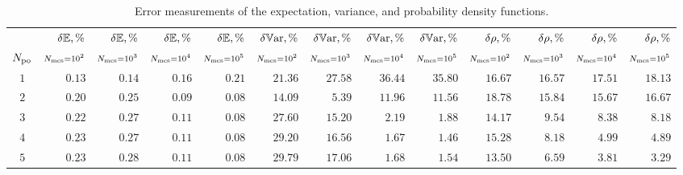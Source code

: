 \begin{table*}
  \centering
  \caption{Error measurements of the expectation, variance, and probability density functions.}
  \begin{tabular}{c@{\csep}r@{\csep}r@{\csep}r@{\csep}r@{\psep}r@{\csep}r@{\csep}r@{\csep}r@{\psep}r@{\csep}r@{\csep}r@{\csep}r}
    \toprule
    {} & $\delta\mathbb{E}, \%$ & $\delta\mathbb{E}, \%$ & $\delta\mathbb{E}, \%$ & $\delta\mathbb{E}, \%$ & $\delta\mathbb{V}\text{ar}, \%$ & $\delta\mathbb{V}\text{ar}, \%$ & $\delta\mathbb{V}\text{ar}, \%$ & $\delta\mathbb{V}\text{ar}, \%$ & $\delta\rho, \%$ & $\delta\rho, \%$ & $\delta\rho, \%$ & $\delta\rho, \%$ \\
    ${N_\text{po}}$ & $\scriptstyle N_\text{mcs} = 10^2$ & $\scriptstyle N_\text{mcs} = 10^3$ & $\scriptstyle N_\text{mcs} = 10^4$ & $\scriptstyle N_\text{mcs} = 10^5$ & $\scriptstyle N_\text{mcs} = 10^2$ & $\scriptstyle N_\text{mcs} = 10^3$ & $\scriptstyle N_\text{mcs} = 10^4$ & $\scriptstyle N_\text{mcs} = 10^5$ & $\scriptstyle N_\text{mcs} = 10^2$ & $\scriptstyle N_\text{mcs} = 10^3$ & $\scriptstyle N_\text{mcs} = 10^4$ & $\scriptstyle N_\text{mcs} = 10^5$ \\
    \cmidrule(r{15pt}){2-5}
    \cmidrule(r{15pt}){6-9}
    \cmidrule{10-13}
    $1$ & $0.13$ & $0.14$ & $0.16$ & $0.21$ & $21.36$ & $27.58$ & $36.44$ & $35.80$ & $16.67$ & $16.57$ & $17.51$ & $18.13$ \\
    $2$ & $0.20$ & $0.25$ & $0.09$ & $0.08$ & $14.09$ & $ 5.39$ & $11.96$ & $11.56$ & $18.78$ & $15.84$ & $15.67$ & $16.67$ \\
    $3$ & $0.22$ & $0.27$ & $0.11$ & $0.08$ & $27.60$ & $15.20$ & $ 2.19$ & $ 1.88$ & $14.17$ & $ 9.54$ & $ 8.38$ & $ 8.18$ \\
    $4$ & $0.23$ & $0.27$ & $0.11$ & $0.08$ & $29.20$ & $16.56$ & $ 1.67$ & $ 1.46$ & $15.28$ & $ 8.18$ & $ 4.99$ & $ 4.89$ \\
    $5$ & $0.23$ & $0.28$ & $0.11$ & $0.08$ & $29.79$ & $17.06$ & $ 1.68$ & $ 1.54$ & $13.50$ & $ 6.59$ & $ 3.81$ & $ 3.29$ \\
    \bottomrule
  \end{tabular}
  \vspace{-10pt}
\end{table*}
